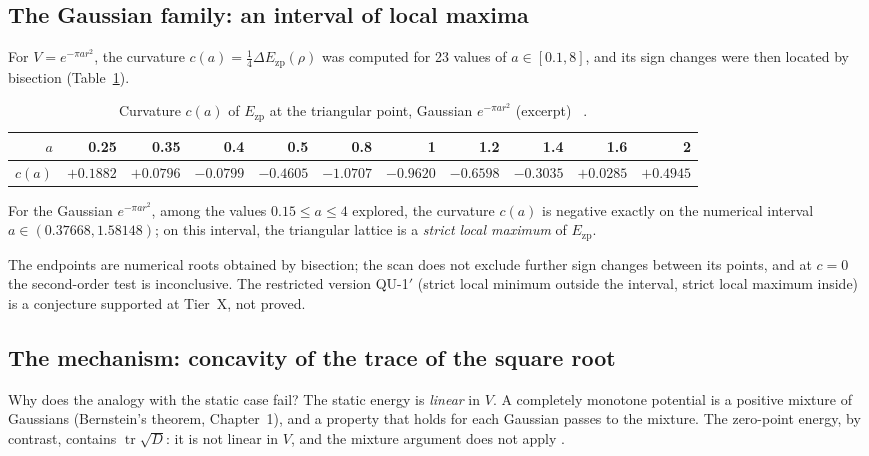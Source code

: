 \subsection{The Gaussian family: an interval of local maxima \tierX}\label{ch3:sec:intervalle}
For $V=e^{-\pi ar^2}$, the curvature $c(a)=\tfrac14\Delta E_{\mathrm{zp}}(\rho)$ was computed for 23 values of
$a\in[0.1, 8]$, and its sign changes were then located by bisection (Table~\ref{ch3:tab:ca}).
\begin{table}[ht]\centering\small
\caption{Curvature $c(a)$ of $E_{\mathrm{zp}}$ at the triangular point, Gaussian $e^{-\pi ar^2}$ (excerpt) \tierX~\cite{ch3-p2zp}.}\label{ch3:tab:ca}
\setlength{\tabcolsep}{3pt}\begin{tabular}{rrrrrrrrrrr}\toprule
$a$ & 0.25 & 0.35 & 0.4 & 0.5 & 0.8 & 1 & 1.2 & 1.4 & 1.6 & 2\\\midrule
$c(a)$ & $+0.1882$ & $+0.0796$ & $-0.0799$ & $-0.4605$ & $-1.0707$ & $-0.9620$ & $-0.6598$ & $-0.3035$ & $+0.0285$ & $+0.4945$\\
\bottomrule\end{tabular}
\end{table}

\begin{proposition}\label{ch3:prop:intervalle}
For the Gaussian $e^{-\pi ar^2}$, among the values $0.15\le a\le4$ explored, the curvature $c(a)$ is negative exactly
on the numerical interval $a\in(0.37668, 1.58148)$; on this interval, the triangular lattice is a
\emph{strict local maximum} of $E_{\mathrm{zp}}$. \tierX
\end{proposition}
\noindent The endpoints are numerical roots obtained by bisection; the scan does not exclude further sign changes
between its points, and at $c=0$ the second-order test is inconclusive. The restricted version QU-1$'$ (strict local
minimum outside the interval, strict local maximum inside) is a conjecture supported at Tier~X, not proved.

\subsection{The mechanism: concavity of the trace of the square root}\label{ch3:sec:mecanisme}
Why does the analogy with the static case fail? The static energy is \emph{linear} in $V$. A completely monotone
potential is a positive mixture of Gaussians (Bernstein's theorem, Chapter~1), and a property that holds for each
Gaussian passes to the mixture. The zero-point energy, by contrast, contains $\operatorname{tr}\sqrt{D}$: it is
not linear in $V$, and the mixture argument does not apply \tierC.

